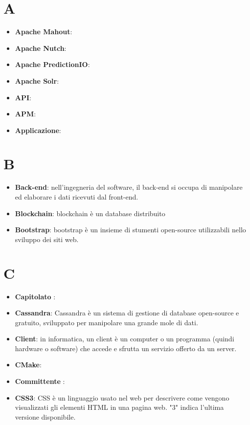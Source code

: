 \documentclass[a4paper, oneside, openany]{article}
\begin{document}
\copertina{}
\tableofcontents
\newpage
\section{A}
\begin{itemize}
\item \textbf{Apache Mahout}:
\item \textbf{Apache Nutch}:
\item \textbf{Apache PredictionIO}:
\item \textbf{Apache Solr}:
\item \textbf{API}:
\item \textbf{APM}:
\item \textbf{Applicazione}:
\end{itemize}

\section{B}
\begin{itemize}
\item \textbf{Back-end}: nell'ingegneria del software, il back-end si occupa di manipolare ed elaborare i dati ricevuti dal front-end.	
\item \textbf{Blockchain}: blockchain è un database distribuito 
\item \textbf{Bootstrap}: bootstrap è un insieme di stumenti open-source utilizzabili nello sviluppo dei siti web.  
\end{itemize}

\section{C}
\begin{itemize}
\item \textbf{Capitolato \color{red}{serve davvero?}}: 
\item \textbf{Cassandra}: Cassandra è un sistema di gestione di database  open-source e gratuito, sviluppato per manipolare una grande mole di dati.
\item \textbf{Client}: in informatica, un client è un computer o un programma (quindi hardware o software) che accede e sfrutta un servizio offerto da un server.
\item \textbf{CMake}:
\item \textbf{Committente \color{red}{serve davvero?}}: 
\item \textbf{CSS3}: CSS è un linguaggio usato nel web per descrivere come vengono visualizzati gli elementi HTML in una pagina web. "3" indica l'ultima versione disponibile.
\end{itemize}
\end{document}
